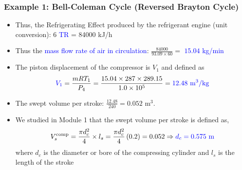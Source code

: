 \documentclass[10pt,compress]{beamer}
\newcommand{\frc}{\displaystyle\frac}
\begin{document}
\begin{frame}
 \frametitle{Example 1: Bell-Coleman Cycle (Reversed Brayton Cycle)}
  \begin{itemize}
   \item <1-> Thus, the Refrigerating Effect produced by the refrigerant engine (unit conversion): 6 \textcolor{blue}{TR} = 84000 kJ/h


   \item <2-> Thus the \textcolor{blue}{mass flow rate of air in circulation}: $\frc{84000}{93.09\times 60}=$ \textcolor{blue}{$15.04$ kg/min}

   \item <3-> The piston displacement of the compressor is $V_{1}$ and defined as
     \begin{displaymath}
      \textcolor{blue}{V_{1}} =  \frc{m R T_{1}}{P_{4}} = \frc{15.04 \times 287 \times 289.15}{1.0\times 10^{5}} = \textcolor{blue}{12.48 \text{ m}^{3}/\text{kg}}
     \end{displaymath}

   \item <4-> The swept volume per stroke: $\frc{12.48}{240}=0.052$ m$^{3}$.

   \item <5-> We studied in Module 1 that the swept volume per stroke is defined as,
     \begin{displaymath}
      V_{s}^{\text{comp}}= \frc{\pi d_{c}^{2}}{4}\times l_{s} = \frc{\pi d_{c}^{2}}{4}\left(0.2\right) = 0.052 \Rightarrow \textcolor{blue}{d_{c} = 0.575\text{ m}}
     \end{displaymath}
    where $d_{c}$ is the diameter or bore of the compressing cylinder and $l_{s}$ is the length of the stroke

  \end{itemize}

\end{frame}
\end{document}

